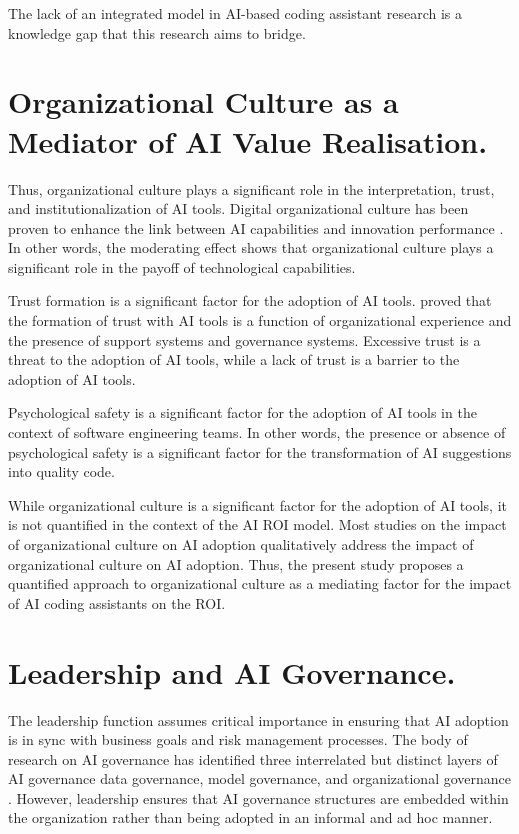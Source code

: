 The lack of an integrated model in AI-based coding assistant research is a knowledge gap that this research aims to bridge.

\section {Organizational Culture as a Mediator of AI Value Realisation.}
\label{sec:Organizational Culture as a Mediator of AI Value Realisation}
Thus, organizational culture plays a significant role in the interpretation, trust, and institutionalization of AI tools. Digital organizational culture has been proven to enhance the link between AI capabilities and innovation performance \autocite{An2024}. In other words, the moderating effect shows that organizational culture plays a significant role in the payoff of technological capabilities.

Trust formation is a significant factor for the adoption of AI tools. \textcite{Daly2025} proved that the formation of trust with AI tools is a function of organizational experience and the presence of support systems and governance systems. Excessive trust is a threat to the adoption of AI tools, while a lack of trust is a barrier to the adoption of AI tools.

Psychological safety is a significant factor for the adoption of AI tools in the context of software engineering teams. In other words, the presence or absence of psychological safety is a significant factor for the transformation of AI suggestions into quality code.

While organizational culture is a significant factor for the adoption of AI tools, it is not quantified in the context of the AI ROI model. Most studies on the impact of organizational culture on AI adoption qualitatively address the impact of organizational culture on AI adoption. Thus, the present study proposes a quantified approach to organizational culture as a mediating factor for the impact of AI coding assistants on the ROI.

\section {Leadership and AI Governance.}
\label{sec:Leadership and AI Governance}
The leadership function assumes critical importance in ensuring that AI adoption is in sync with business goals and risk management processes. The body of research on AI governance has identified three interrelated but distinct layers of AI governance data governance, model governance, and organizational governance \autocite{Schneider2023}. However, leadership ensures that AI governance structures are embedded within the organization rather than being adopted in an informal and ad hoc manner.

